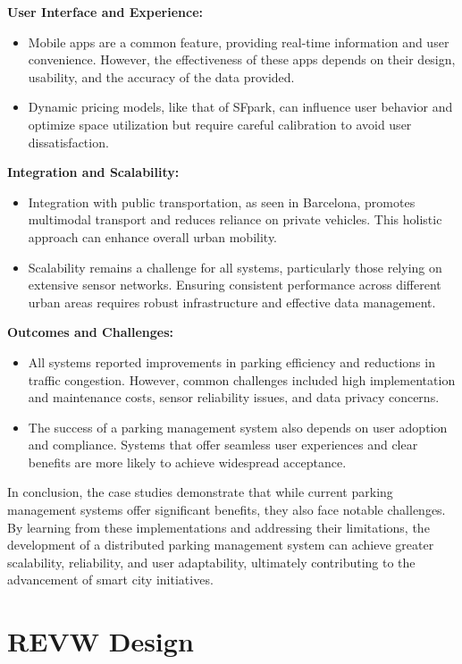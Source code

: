 \documentclass[oneside, 12pt, a4paper, draft]{book}
\begin{document}
\textbf{User Interface and Experience:}
\begin{itemize}
\item Mobile apps are a common feature, providing real-time information and user convenience. However, the effectiveness of these apps depends on their design, usability, and the accuracy of the data provided.
\item Dynamic pricing models, like that of SFpark, can influence user behavior and optimize space utilization but require careful calibration to avoid user dissatisfaction.
\end{itemize}

\textbf{Integration and Scalability:}
\begin{itemize}
\item Integration with public transportation, as seen in Barcelona, promotes multimodal transport and reduces reliance on private vehicles. This holistic approach can enhance overall urban mobility.
\item Scalability remains a challenge for all systems, particularly those relying on extensive sensor networks. Ensuring consistent performance across different urban areas requires robust infrastructure and effective data management.
\end{itemize}

\textbf{Outcomes and Challenges:}
\begin{itemize}
\item All systems reported improvements in parking efficiency and reductions in traffic congestion. However, common challenges included high implementation and maintenance costs, sensor reliability issues, and data privacy concerns.
\item The success of a parking management system also depends on user adoption and compliance. Systems that offer seamless user experiences and clear benefits are more likely to achieve widespread acceptance.
\end{itemize}

In conclusion, the case studies demonstrate that while current parking management systems offer significant benefits, they also face notable challenges. By learning from these implementations and addressing their limitations, the development of a distributed parking management system can achieve greater scalability, reliability, and user adaptability, ultimately contributing to the advancement of smart city initiatives.
\part{REVW Design}
\label{sec:orge83c51e}
\end{document}
